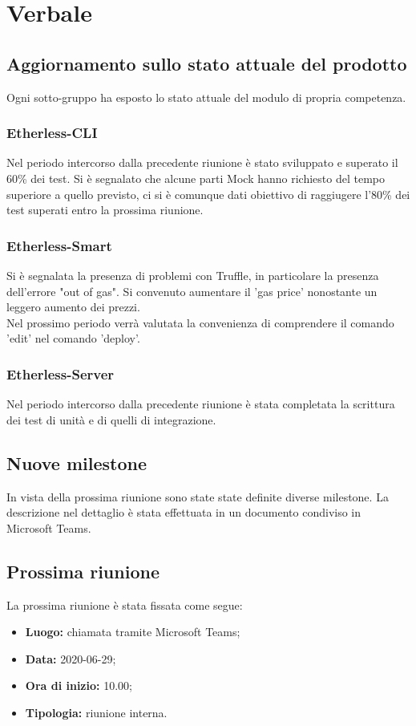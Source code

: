 \section{Verbale}

	\subsection{Aggiornamento sullo stato attuale del prodotto}
		Ogni sotto-gruppo ha esposto lo stato attuale del modulo\textit{} di propria competenza.
		
		\subsubsection{Etherless-CLI}
			Nel periodo intercorso dalla precedente riunione è stato sviluppato e superato il 60\% dei test. Si è segnalato che alcune parti Mock\textit{} hanno richiesto del tempo superiore a quello previsto, ci si è comunque dati obiettivo di raggiugere l'80\% dei test superati entro la prossima riunione.
			
		\subsubsection{Etherless-Smart}
			Si è segnalata la presenza di problemi con Truffle, in particolare la presenza dell'errore "out of gas". Si convenuto aumentare il 'gas price' nonostante un leggero aumento dei prezzi. \\
			Nel prossimo periodo verrà valutata la convenienza di comprendere il comando 'edit' nel comando 'deploy'.
			
		\subsubsection{Etherless-Server}
			Nel periodo intercorso dalla precedente riunione è stata completata la scrittura dei test di unità e di quelli di integrazione.
	
	\subsection{Nuove milestone}
		In vista della prossima riunione sono state state definite diverse milestone. La descrizione nel dettaglio è stata effettuata in un documento condiviso in Microsoft Teams.
				
	\subsection{Prossima riunione}
		La prossima riunione è stata fissata come segue:
		\begin{itemize}
			\item \textbf{Luogo:} chiamata tramite Microsoft Teams; 
			\item \textbf{Data:} 2020-06-29;
			\item \textbf{Ora di inizio:} 10.00;
			\item \textbf{Tipologia:} riunione interna.
		\end{itemize}